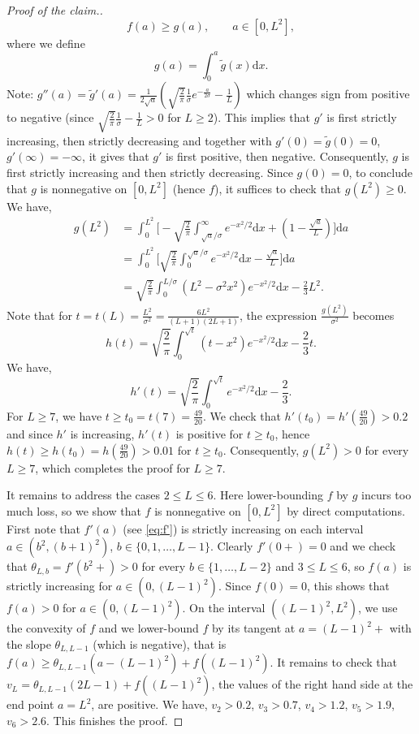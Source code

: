 \documentclass[10pt]{article}
\newcommand{\dd}{\mathrm{d}}
\newcommand{\1}{\textbf{1}}
\theoremstyle{remark}
\theoremstyle{definition}
\begin{document}
\begin{proof}[Proof of the claim.]
\[
f(a) \geq g(a), \qquad a \in [0,L^2],
\]
where we define
\[
g(a) = \int_0^a \tilde g(x)\dd x.
\]
Note: $g''(a) = \tilde g'(a) = \frac{1}{2\sqrt{a}}\left(\sqrt{\frac{2}{\pi}}\frac{1}{\sigma}e^{-\frac{a}{2\sigma}} - \frac{1}{L}\right)$ which changes sign from positive to negative (since $\sqrt{\frac{2}{\pi}}\frac{1}{\sigma} - \frac{1}{L} > 0$ for $L \geq 2$). This implies that $g'$ is first strictly increasing, then strictly decreasing and together with $g'(0) = \tilde g(0) = 0$, $g'(\infty) = -\infty$, it gives that $g'$ is first positive, then negative. Consequently, $g$ is first strictly increasing and then strictly decreasing. Since $g(0) = 0$, to conclude that $g$ is nonnegative on $[0,L^2]$ (hence $f$), it suffices to check that $g(L^2) \geq 0$. We have,
\begin{align*}
g(L^2) &= \int_0^{L^2}\Bigg[-\sqrt{\frac{2}{\pi}}\int_{\sqrt{a}/\sigma}^{\infty}e^{-x^2/2}\dd x + \left(1 -  \frac{\sqrt{a}}{L}\right)\Bigg] \dd a \\
&=\int_0^{L^2}\Bigg[\sqrt{\frac{2}{\pi}}\int_{0}^{\sqrt{a}/\sigma}e^{-x^2/2}\dd x - \frac{\sqrt{a}}{L} \Bigg] \dd a \\
&= \sqrt{\frac{2}{\pi}}\int_0^{L/\sigma} (L^2-\sigma^2x^2)e^{-x^2/2} \dd x - \frac{2}{3}L^2.
\end{align*}
Note that for $t = t(L) = \frac{L^2}{\sigma^2} = \frac{6L^2}{(L+1)(2L+1)}$, the expression $\frac{g(L^2)}{\sigma^2}$ becomes
\[
h(t) = \sqrt{\frac{2}{\pi}}\int_0^{\sqrt{t}} (t-x^2)e^{-x^2/2} \dd x - \frac{2}{3}t.
\]
We have,
\[
h'(t) = \sqrt{\frac{2}{\pi}}\int_0^{\sqrt{t}} e^{-x^2/2} \dd x - \frac{2}{3}.
\]
For $L \geq 7$, we have $t \geq t_0 = t(7) = \frac{49}{20}$. We check that $h'(t_0) = h'(\frac{49}{20})> 0.2$ and since $h'$ is increasing, $h'(t)$ is positive for $t \geq t_0$, hence $h(t) \geq h(t_0) = h(\frac{49}{20}) > 0.01$ for $t \geq t_0$. Consequently, $g(L^2) > 0$ for every $L \geq 7$, which completes the proof for $L \geq 7$.

It remains to address the cases $2 \leq L \leq 6$. Here lower-bounding $f$ by $g$ incurs too much loss, so we show that $f$ is nonnegative on $[0,L^2]$ by direct computations. First note that $f'(a)$ (see \eqref{eq:f'}) is strictly increasing on each interval $a \in (b^2,(b+1)^2)$, $b \in \{0,1,\ldots, L-1\}$. Clearly $f'(0+) = 0$ and we check that $\theta_{L,b} = f'(b^2+) > 0$ for every $b \in \{1,\ldots,L-2\}$ and $3 \leq L \leq 6$, so $f(a)$ is strictly increasing for $a \in (0,(L-1)^2)$. Since $f(0) = 0$, this shows that $f(a) > 0$ for $a \in (0,(L-1)^2)$. On the interval $((L-1)^2,L^2)$, we use the convexity of $f$ and we lower-bound $f$ by its tangent at $a = (L-1)^2+$ with the slope $\theta_{L,L-1}$ (which is negative), that is $f(a) \geq \theta_{L,L-1}(a - (L-1)^2) + f((L-1)^2)$. It remains to check that $v_L = \theta_{L,L-1}(2L-1) + f((L-1)^2)$, the values of the right hand side at the end point $a = L^2$, are positive. We have, $v_2 > 0.2$, $v_3 > 0.7$, $v_4 > 1.2$, $v_5 > 1.9$, $v_6 > 2.6$. This finishes the proof.
\end{proof}
\end{document}
